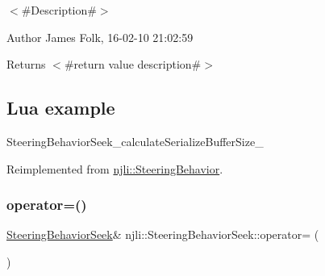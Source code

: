 $<$\#\+Description\#$>$ 

\begin{DoxyAuthor}{Author}
James Folk, 16-\/02-\/10 21\+:02\+:59
\end{DoxyAuthor}
\begin{DoxyReturn}{Returns}
$<$\#return value description\#$>$
\end{DoxyReturn}
\hypertarget{classnjli_1_1_steering_behavior_wander_ex1}{}\subsection{Lua example}\label{classnjli_1_1_steering_behavior_wander_ex1}

\begin{DoxyCodeInclude}
\end{DoxyCodeInclude}
Steering\+Behavior\+Seek\+\_\+calculate\+Serialize\+Buffer\+Size\+\_\+ 

Reimplemented from \mbox{\hyperlink{classnjli_1_1_steering_behavior_acd7af46e42a8a3fc1208a47f50836ac8}{njli\+::\+Steering\+Behavior}}.

\mbox{\label{classnjli_1_1_steering_behavior_seek_a97b14bd488e252cbf0b31d8ed7b6b25f}} 
\subsubsection{\texorpdfstring{operator=()}{operator=()}}
{\footnotesize\ttfamily \mbox{\hyperlink{classnjli_1_1_steering_behavior_seek}{Steering\+Behavior\+Seek}}\& njli\+::\+Steering\+Behavior\+Seek\+::operator= (\begin{DoxyParamCaption}\item[{const \mbox{\hyperlink{classnjli_1_1_steering_behavior_seek}{Steering\+Behavior\+Seek}} \&}]{ }\end{DoxyParamCaption})\hspace{0.3cm}{\ttfamily [protected]}}

\mbox{\label{classnjli_1_1_steering_behavior_seek_aa6b4f5010360d6a5d99177cd8ccae178}} 
